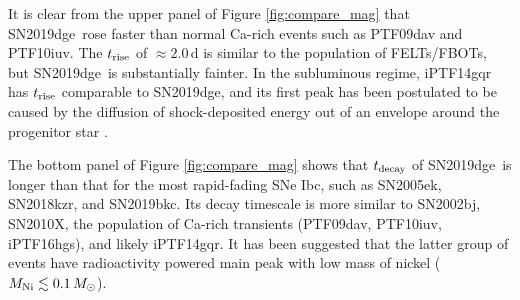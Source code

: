\documentclass[twocolumn]{aastex63}
\newcommand{\name}{SN2019dge}
\begin{document}
It is clear from the upper panel of Figure \ref{fig:compare_mag} that \name\ rose faster than normal 
Ca-rich events such as PTF09dav and PTF10iuv. The $t_{\rm rise}$ of $\approx 2.0$\,d is similar to 
the population of FELTs/FBOTs, but \name\ is substantially fainter. In the subluminous regime, 
iPTF14gqr has $t_{\rm rise}$ comparable to \name, and its first peak has been postulated to be caused 
by the diffusion of shock-deposited energy out of an envelope around the progenitor star 
\citep{De2018}.
 
The bottom panel of Figure \ref{fig:compare_mag} shows that $t_{\rm decay}$ of \name\ is 
longer than that for the most rapid-fading SNe Ibc, such as SN2005ek, SN2018kzr, 
and SN2019bkc. Its decay timescale is more similar to SN2002bj, SN2010X, the population of Ca-rich 
transients (PTF09dav, PTF10iuv, iPTF16hgs), and likely iPTF14gqr. It has been suggested that the latter 
group of events have radioactivity powered main peak with low mass of nickel ($M_{\rm Ni} \lesssim 0.1 
\,M_\odot$).
\end{document}
